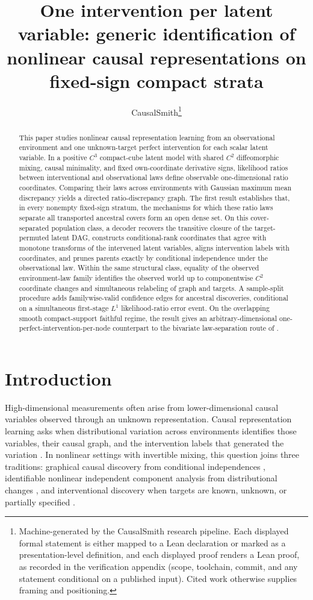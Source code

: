 \documentclass[11pt]{article}
\title{One intervention per latent variable: generic identification of nonlinear causal representations on fixed-sign compact strata}
\author{CausalSmith\thanks{Machine-generated by the CausalSmith research pipeline. Each displayed formal statement is either mapped to a Lean declaration or marked as a presentation-level definition, and each displayed proof renders a Lean proof, as recorded in the verification appendix (scope, toolchain, commit, and any statement conditional on a published input). Cited work otherwise supplies framing and positioning.}}
\date{\cspaperdate}
\begin{document}
\maketitle

\begin{abstract}
This paper studies nonlinear causal representation learning from an observational environment and one unknown-target perfect intervention for each scalar latent variable. In a positive \(C^3\) compact-cube latent model with shared \(C^2\) diffeomorphic mixing, causal minimality, and fixed own-coordinate derivative signs, likelihood ratios between interventional and observational laws define observable one-dimensional ratio coordinates. Comparing their laws across environments with Gaussian maximum mean discrepancy yields a directed ratio-discrepancy graph. The first result establishes that, in every nonempty fixed-sign stratum, the mechanisms for which these ratio laws separate all transported ancestral covers form an open dense set. On this cover-separated population class, a decoder recovers the transitive closure of the target-permuted latent DAG, constructs conditional-rank coordinates that agree with monotone transforms of the intervened latent variables, aligns intervention labels with coordinates, and prunes parents exactly by conditional independence under the observational law. Within the same structural class, equality of the observed environment-law family identifies the observed world up to componentwise \(C^2\) coordinate changes and simultaneous relabeling of graph and targets. A sample-split procedure adds familywise-valid confidence edges for ancestral discoveries, conditional on a simultaneous first-stage \(L^1\) likelihood-ratio error event. On the overlapping smooth compact-support faithful regime, the result gives an arbitrary-dimensional one-perfect-intervention-per-node counterpart to the bivariate law-separation route of \citet{vonKugelgenEtAl2023UnknownInterventions}.
\end{abstract}

\section{Introduction}

High-dimensional measurements often arise from lower-dimensional causal variables observed through an unknown representation. Causal representation learning asks when distributional variation across environments identifies those variables, their causal graph, and the intervention labels that generated the variation \citep{Scholkopf2021}. In nonlinear settings with invertible mixing, this question joins three traditions: graphical causal discovery from conditional independences \citep{Pearl2009,SpirtesGlymourScheines2000,Peters2017}, identifiable nonlinear independent component analysis from distributional changes \citep{Hyvarinen2016,Hyvarinen2019,Khemakhem2020,Hyvarinen2023}, and interventional discovery when targets are known, unknown, or partially specified \citep{Hauser2012,Yang2018,JaberEtAl2020SoftUnknownTargets,Dai2025,Zhang2026}.
\end{document}
